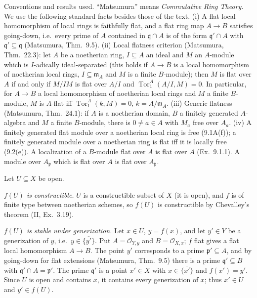 \documentclass[11pt]{article}
\begin{document}
Conventions and results used. ``Matsumura'' means \emph{Commutative Ring Theory}. We use the following standard facts besides those of the text. (i) A flat local homomorphism of local rings is faithfully flat, and a flat ring map $A\to B$ satisfies going-down, i.e.\ every prime of $A$ contained in $\mathfrak q\cap A$ is of the form $\mathfrak q'\cap A$ with $\mathfrak q'\subseteq\mathfrak q$ (Matsumura, Thm.~9.5). (ii) Local flatness criterion (Matsumura, Thm.~22.3): let $A$ be a noetherian ring, $I\subseteq A$ an ideal and $M$ an $A$-module which is $I$-adically ideal-separated (this holds if $A\to B$ is a local homomorphism of noetherian local rings, $I\subseteq\mathfrak m_A$ and $M$ is a finite $B$-module); then $M$ is flat over $A$ if and only if $M/IM$ is flat over $A/I$ and $\operatorname{Tor}_1^A(A/I,M)=0$. In particular, for $A\to B$ a local homomorphism of noetherian local rings and $M$ a finite $B$-module, $M$ is $A$-flat iff $\operatorname{Tor}_1^A(k,M)=0$, $k=A/\mathfrak m_A$. (iii) Generic flatness (Matsumura, Thm.~24.1): if $A$ is a noetherian domain, $B$ a finitely generated $A$-algebra and $M$ a finite $B$-module, there is $0\ne a\in A$ with $M_a$ free over $A_a$. (iv) A finitely generated flat module over a noetherian local ring is free (9.1A(f)); a finitely generated module over a noetherian ring is flat iff it is locally free (9.2(e)). A localization of a $B$-module flat over $A$ is flat over $A$ (Ex.~9.1.1). A module over $A_{\mathfrak p}$ which is flat over $A$ is flat over $A_{\mathfrak p}$.

\pf
Let $U\subseteq X$ be open.

\emph{$f(U)$ is constructible.} $U$ is a constructible subset of $X$ (it is open), and $f$ is of finite type between noetherian schemes, so $f(U)$ is constructible by Chevalley's theorem (II, Ex.~3.19).

\emph{$f(U)$ is stable under generization.} Let $x\in U$, $y=f(x)$, and let $y'\in Y$ be a generization of $y$, i.e.\ $y\in\overline{\{y'\}}$. Put $A=\mathcal O_{Y,y}$ and $B=\mathcal O_{X,x}$; $f$ flat gives a flat local homomorphism $A\to B$. The point $y'$ corresponds to a prime $\mathfrak p'\subseteq A$, and by going-down for flat extensions (Matsumura, Thm.~9.5) there is a prime $\mathfrak q'\subseteq B$ with $\mathfrak q'\cap A=\mathfrak p'$. The prime $\mathfrak q'$ is a point $x'\in X$ with $x\in\overline{\{x'\}}$ and $f(x')=y'$. Since $U$ is open and contains $x$, it contains every generization of $x$; thus $x'\in U$ and $y'\in f(U)$.
\end{document}
